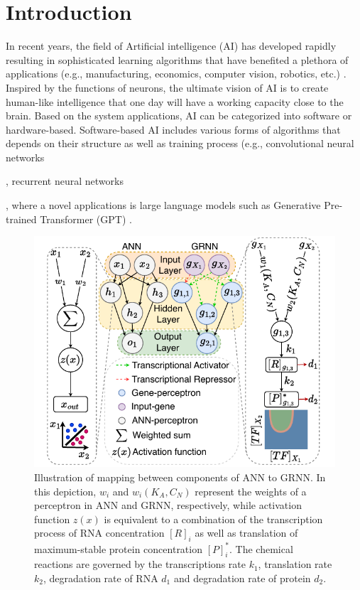 \documentclass[twocolumn]{biophys-new}
\begin{document}
\section*{Introduction}
In recent years, the field of Artificial intelligence (AI) has developed rapidly resulting in sophisticated learning algorithms that have benefited a plethora of applications (e.g., manufacturing, economics, computer vision, robotics, etc.) \cite{chowdhury2012advantages}.
Inspired by the functions of neurons, the ultimate vision of AI is to create human-like intelligence that one day will have a working capacity close to the brain. 
Based on the system applications, AI can be categorized into software or hardware-based. Software-based AI includes various forms of algorithms that depends on their structure as well as training process (e.g., convolutional neural networks {\cite{li2021survey}, recurrent neural networks {\cite{medsker2001recurrent}, where a novel applications is large language models such as Generative Pre-trained Transformer (GPT)   \cite{kasneci2023chatgpt}. %
\begin{figure}[ht!] %
\centering
\includegraphics[width=0.9\linewidth]{figures/abstract_fig.pdf}
\caption{Illustration of mapping between components of ANN to GRNN. In this depiction, $w_i$ and $w_i(K_A, C_N)$ represent the weights of a perceptron in ANN and GRNN, respectively, while activation function $z(x)$ is equivalent to a combination of the transcription process of RNA concentration $[R]_i$ as well as translation of maximum-stable protein concentration $[P]_i^*$. The chemical reactions are governed by the transcriptions rate $k_1$, translation rate $k_2$, degradation rate of RNA $d_1$ and degradation rate of protein $d_2$. \vspace{1em}
}
\end{figure}}}
\end{document}

